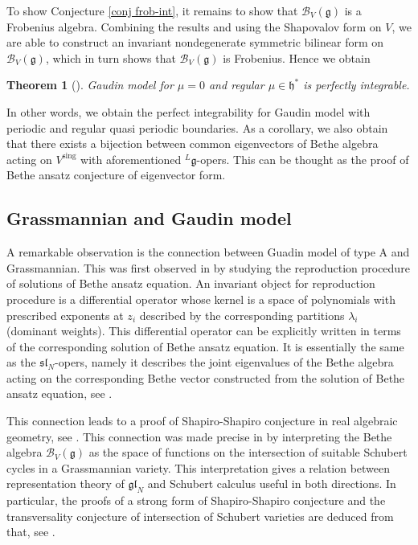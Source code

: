 \documentclass[11pt,reqno]{amsart}
\numberwithin{equation}{section}
\newtheorem{thm}{Theorem}[section]
\theoremstyle{definition}
\theoremstyle{remark}
\newcommand{\mc}{\mathcal}
\newcommand{\gl}{\mathfrak{gl}}
\newcommand{\g}{\mathfrak{g}}
\newcommand{\h}{\mathfrak{h}}
\newcommand{\sing}{{\mathrm{sing}}}
\newcommand{\la}{\lambda}
\begin{document}
To show Conjecture \ref{conj frob-int}, it remains to show that $\mc B_V(\g)$ is a Frobenius algebra. Combining the results  \cite{FF:1992,FFRy:2010,Ryb:2018} and using the Shapovalov form on $V$, we are able to construct an invariant nondegenerate symmetric bilinear form on $\mc B_V(\g)$, which in turn shows that $\mc B_V(\g)$ is Frobenius. Hence we obtain

\begin{thm}[\cite{Lu:2019}]
Gaudin model for $\mu=0$ and regular $\mu\in\h^*$ is perfectly integrable.
\end{thm}
In other words, we obtain the perfect integrability for Gaudin model with periodic and regular quasi periodic boundaries. As a corollary, we also obtain that there exists a bijection between common eigenvectors of Bethe algebra acting on $V^\sing$ with aforementioned $^L\g$-opers. This can be thought as the proof of Bethe ansatz conjecture of eigenvector form.

\subsection{Grassmannian and Gaudin model}\label{sec:Grass}
A remarkable observation is the connection between Guadin model of type A and Grassmannian. This was first observed in \cite{MV:2004} by studying the reproduction procedure of solutions of Bethe ansatz equation. An invariant object for reproduction procedure is a differential operator whose kernel is a space of polynomials with prescribed exponents at $z_i$ described by the corresponding partitions $\la_i$ (dominant weights). This differential operator can be explicitly written in terms of the corresponding solution of Bethe ansatz equation. It is essentially the same as the $\mathfrak{sl}_N$-opers, namely it describes the joint eigenvalues of the Bethe algebra acting on the corresponding Bethe vector constructed from the solution of Bethe ansatz equation, see \cite{FFRe,MTV:2006}.

This connection leads to a proof of Shapiro-Shapiro conjecture in real algebraic geometry, see \cite{MTV:2009a}. This connection was made precise in \cite{MTV:2009b} by interpreting the Bethe algebra $\mathcal B_V(\g)$ as the space of functions on the intersection of suitable Schubert cycles in a Grassmannian variety. This interpretation gives a relation between representation theory of $\gl_N$ and Schubert calculus useful in both directions. In particular, the proofs of a strong form of Shapiro-Shapiro conjecture and the transversality conjecture of intersection of Schubert varieties are deduced from that, see \cite{MTV:2009b}.
\end{document}

